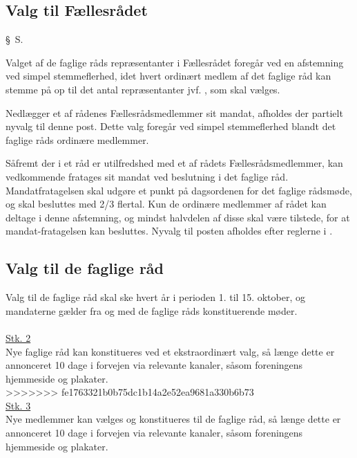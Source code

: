 \begin{list}
\subsection{Valg til Fællesrådet}
\label{kap:valgtilfaellesraad}

\begin{list}
{\S\ S.}{}
    \setlength{\labelwidth}{.5in}%
    \setlength{\leftmargin}{.25in} %


\item \label{S:FR:valgtilFR} Valget af de faglige råds repræsentanter i Fællesrådet foregår ved en afstemning ved simpel stemmeflerhed, idet hvert ordinært medlem af det faglige råd kan stemme på op til det antal repræsentanter jvf. , som skal vælges.

\item \label{S:FR:nyvalgFR} Nedlægger et af rådenes Fællesrådsmedlemmer sit mandat, afholdes der partielt nyvalg til denne post. Dette valg foregår ved simpel stemmeflerhed blandt det faglige råds ordinære medlemmer.

\item \label{S:FR:omvalgFR} Såfremt der i et råd er utilfredshed med et af rådets Fællesrådsmedlemmer, kan vedkommende fratages sit mandat ved beslutning i det faglige råd. Mandatfratagelsen skal udgøre et punkt på dagsordenen for det faglige rådsmøde, og skal besluttes med 2/3 flertal. Kun de ordinære medlemmer af rådet kan deltage i denne afstemning, og mindst halvdelen af disse skal være tilstede, for at mandat-fratagelsen kan besluttes. Nyvalg til posten afholdes efter reglerne i  .



\subsection{Valg til de faglige råd}
\label{S:kap:valgtilfagligraad}
\item \label{S:Faglig:ValgtilFaglig} Valg til de faglige råd skal ske hvert år i perioden 1. til 15. oktober, og mandaterne gælder fra og med de faglige råds konstituerende møder.\\
\\
\underline{Stk. 2} \\
Nye faglige råd kan konstitueres ved et ekstraordinært valg, så længe dette er annonceret 10 dage i forvejen via relevante kanaler, såsom foreningens hjemmeside og plakater.\\
>>>>>>> fe1763321b0b75dc1b14a2e52ea9681a330b6b73
\\
\underline{Stk. 3} \\
Nye medlemmer kan vælges og konstitueres til de faglige råd, så længe dette er annonceret 10 dage i forvejen via relevante kanaler, såsom foreningens hjemmeside og plakater.\\


\end{list}
\end{list}
